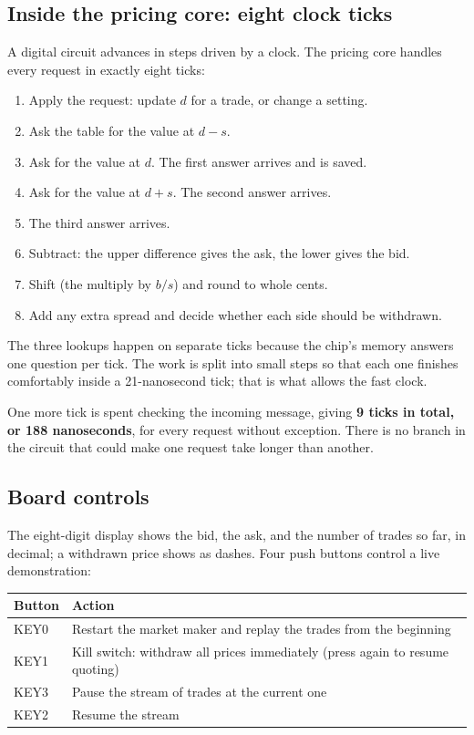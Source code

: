 \documentclass[11pt]{article}
\begin{document}
\subsection{Inside the pricing core: eight clock ticks}

A digital circuit advances in steps driven by a clock. The pricing core handles
every request in exactly eight ticks:

\begin{enumerate}
  \item Apply the request: update $d$ for a trade, or change a setting.
  \item Ask the table for the value at $d - s$.
  \item Ask for the value at $d$. The first answer arrives and is saved.
  \item Ask for the value at $d + s$. The second answer arrives.
  \item The third answer arrives.
  \item Subtract: the upper difference gives the ask, the lower gives the bid.
  \item Shift (the multiply by $b/s$) and round to whole cents.
  \item Add any extra spread and decide whether each side should be withdrawn.
\end{enumerate}

The three lookups happen on separate ticks because the chip's memory answers
one question per tick. The work is split into small steps so that each one
finishes comfortably inside a 21-nanosecond tick; that is what allows the fast
clock.

One more tick is spent checking the incoming message, giving \textbf{9 ticks
in total, or 188 nanoseconds}, for every request without exception. There is
no branch in the circuit that could make one request take longer than another.

\subsection{Board controls}

The eight-digit display shows the bid, the ask, and the number of trades so
far, in decimal; a withdrawn price shows as dashes. Four push buttons control
a live demonstration:

\begin{center}
\begin{tabular}{ll}
\toprule
Button & Action \\
\midrule
KEY0 & Restart the market maker and replay the trades from the beginning \\
KEY1 & Kill switch: withdraw all prices immediately (press again to resume quoting) \\
KEY3 & Pause the stream of trades at the current one \\
KEY2 & Resume the stream \\
\bottomrule
\end{tabular}
\end{center}
\end{document}
